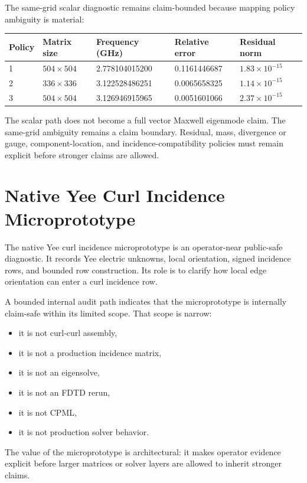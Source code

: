 \documentclass[11pt,a4paper]{article}
\begin{document}
The same-grid scalar diagnostic remains claim-bounded because mapping policy ambiguity is material:

\begin{center}
\begin{tabular}{lllll}
\toprule
Policy & Matrix size & Frequency (GHz) & Relative error & Residual norm \\
\midrule
1 & $504\times504$ & 2.778104015200 & 0.1161446687 & $1.83\times10^{-15}$ \\
2 & $336\times336$ & 3.122528486251 & 0.0065658325 & $1.14\times10^{-15}$ \\
3 & $504\times504$ & 3.126946915965 & 0.0051601066 & $2.37\times10^{-15}$ \\
\bottomrule
\end{tabular}
\end{center}

The scalar path does not become a full vector Maxwell eigenmode claim. The same-grid ambiguity remains a claim boundary. Residual, mass, divergence or gauge, component-location, and incidence-compatibility policies must remain explicit before stronger claims are allowed.

\section{Native Yee Curl Incidence Microprototype}

The native Yee curl incidence microprototype is an operator-near public-safe diagnostic. It records Yee electric unknowns, local orientation, signed incidence rows, and bounded row construction. Its role is to clarify how local edge orientation can enter a curl incidence row.

A bounded internal audit path indicates that the microprototype is internally claim-safe within its limited scope. That scope is narrow:

\begin{itemize}
  \item it is not curl-curl assembly,
  \item it is not a production incidence matrix,
  \item it is not an eigensolve,
  \item it is not an FDTD rerun,
  \item it is not CPML,
  \item it is not production solver behavior.
\end{itemize}

The value of the microprototype is architectural: it makes operator evidence explicit before larger matrices or solver layers are allowed to inherit stronger claims.
\end{document}
